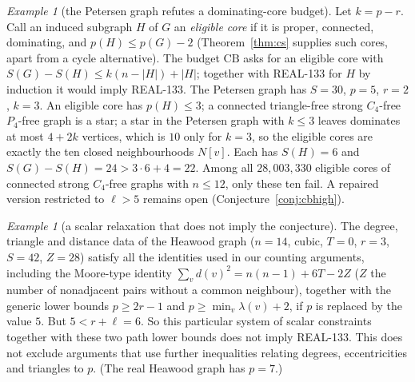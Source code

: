 \documentclass[11pt]{amsart}
\theoremstyle{definition}
\theoremstyle{remark}
\newtheorem{example}[theorem]{Example}
\newcommand{\lr}{\ell}
\newcommand{\pp}{p}
\begin{document}
\begin{example}[the Petersen graph refutes a dominating-core budget]\label{ex:cb}
Let $k=\pp-r$. Call an induced subgraph $H$ of $G$ an \emph{eligible core} if it is proper, connected, dominating, and $\pp(H)\le\pp(G)-2$ (Theorem~\ref{thm:cs} supplies such cores, apart from a cycle alternative). The budget $\mathrm{CB}$ asks for an eligible core with $S(G)-S(H)\le k(n-|H|)+|H|$; together with REAL-133 for $H$ by induction it would imply REAL-133. The Petersen graph has $S=30$, $\pp=5$, $r=2$, $k=3$. An eligible core has $\pp(H)\le3$; a connected triangle-free strong $C_4$-free $P_4$-free graph is a star; a star in the Petersen graph with $k\le3$ leaves dominates at most $4+2k$ vertices, which is $10$ only for $k=3$, so the eligible cores are exactly the ten closed neighbourhoods $N[v]$. Each has $S(H)=6$ and $S(G)-S(H)=24>3\cdot6+4=22$. Among all $28{,}003{,}330$ eligible cores of connected strong $C_4$-free graphs with $n\le12$, only these ten fail. A repaired version restricted to $\lr>5$ remains open (Conjecture~\ref{conj:cbhigh}).
\end{example}

\begin{example}[a scalar relaxation that does not imply the conjecture]\label{ex:heawood}
The degree, triangle and distance data of the Heawood graph ($n=14$, cubic, $T=0$, $r=3$, $S=42$, $Z=28$) satisfy all the identities used in our counting arguments, including the Moore-type identity $\sum_vd(v)^2=n(n-1)+6T-2Z$ ($Z$ the number of nonadjacent pairs without a common neighbour), together with the generic lower bounds $\pp\ge2r-1$ and $\pp\ge\min_v\lambda(v)+2$, if $\pp$ is replaced by the value $5$. But $5<r+\lr=6$. So this particular system of scalar constraints together with these two path lower bounds does not imply REAL-133. This does not exclude arguments that use further inequalities relating degrees, eccentricities and triangles to $\pp$. (The real Heawood graph has $\pp=7$.)
\end{example}
\end{document}
